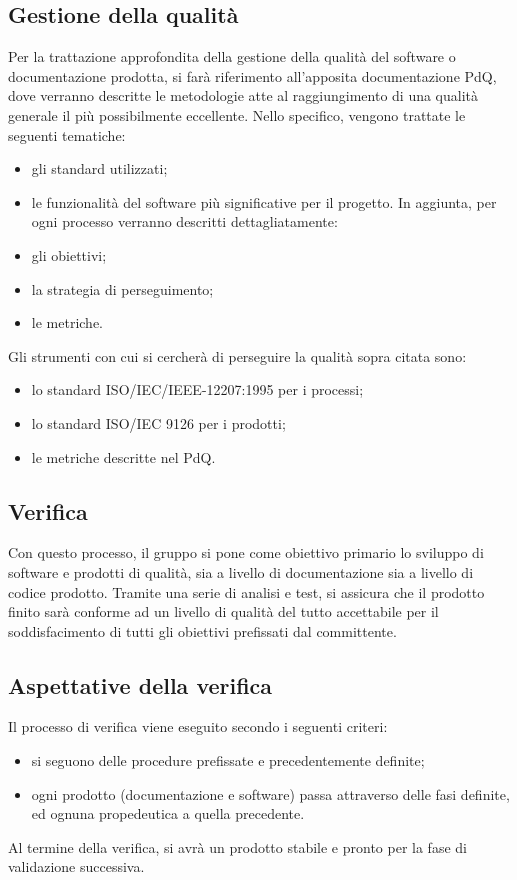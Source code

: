 \subsection{Gestione della qualità}
Per la trattazione approfondita della gestione della qualità del software o documentazione prodotta, si farà riferimento all’apposita documentazione PdQ, dove verranno descritte le metodologie atte al raggiungimento di una qualità generale il più possibilmente eccellente. Nello specifico, vengono trattate le seguenti tematiche:
\begin{itemize}
	\item gli standard utilizzati;{\Gruppo}
	\item le funzionalità del software più significative per il progetto. 
In aggiunta, per ogni processo verranno descritti dettagliatamente:
	\item gli obiettivi;
	\item la strategia di perseguimento;
	\item le metriche.
\end{itemize}
Gli strumenti con cui si cercherà di perseguire la qualità sopra citata sono:
\begin{itemize}
	\item lo standard ISO/IEC/IEEE-12207:1995 per i processi;
	\item lo standard ISO/IEC 9126 per i prodotti;
	\item le metriche descritte nel PdQ.
\end{itemize}

\subsection{Verifica}
Con questo processo, il gruppo {\Gruppo} si pone come obiettivo primario lo sviluppo di software e prodotti di qualità, sia a livello di documentazione sia a livello di codice prodotto. Tramite una serie di analisi e test, si assicura che il prodotto finito sarà conforme ad un livello di qualità del tutto accettabile per il soddisfacimento di tutti gli obiettivi prefissati dal committente. 
\subsection{Aspettative della verifica}
Il processo di verifica viene eseguito secondo i seguenti criteri:
\begin{itemize}
	\item si seguono delle procedure prefissate e precedentemente definite;
	\item ogni prodotto (documentazione e software) passa attraverso delle fasi definite, ed ognuna propedeutica a quella precedente.
	\end{itemize}
Al termine della verifica, si avrà un prodotto stabile e pronto per la fase di validazione successiva.

